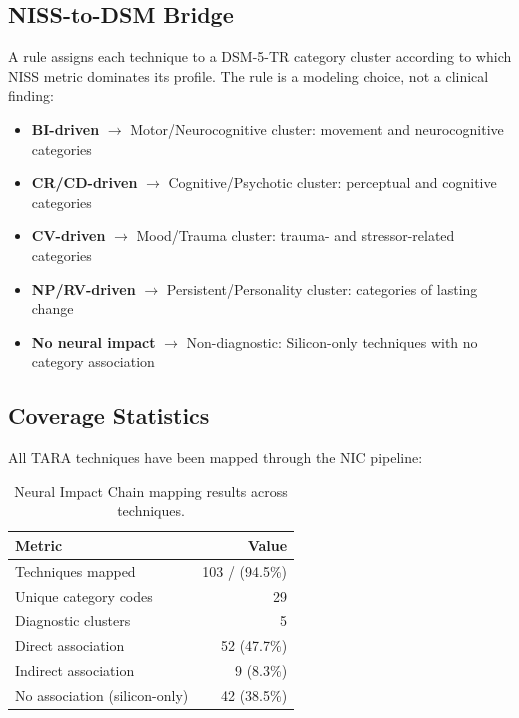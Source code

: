 \subsection{NISS-to-DSM Bridge}

A rule assigns each technique to a DSM-5-TR category cluster according to which NISS
metric dominates its profile. The rule is a modeling choice, not a clinical finding:

\begin{itemize}
  \item \textbf{BI-driven} $\to$ Motor/Neurocognitive cluster: movement and
        neurocognitive categories
  \item \textbf{CR/CD-driven} $\to$ Cognitive/Psychotic cluster: perceptual and
        cognitive categories
  \item \textbf{CV-driven} $\to$ Mood/Trauma cluster: trauma- and stressor-related
        categories
  \item \textbf{NP/RV-driven} $\to$ Persistent/Personality cluster: categories of
        lasting change
  \item \textbf{No neural impact} $\to$ Non-diagnostic: Silicon-only
        techniques with no category association
\end{itemize}

\subsection{Coverage Statistics}

All \SnapshotTechniques{} TARA techniques have been mapped through the NIC pipeline:

\begin{table}[H]
\centering
\caption{Neural Impact Chain mapping results across \SnapshotTechniques{} techniques.}
\label{tab:nic-stats}
\small
\begin{tabular}{@{}l r@{}}
\toprule
\textbf{Metric} & \textbf{Value} \\
\midrule
Techniques mapped                 & 103 / \SnapshotTechniques{} (94.5\%) \\
Unique category codes             & 29 \\
Diagnostic clusters               & 5 \\
Direct association                 & 52 (47.7\%) \\
Indirect association               & 9 (8.3\%) \\
No association (silicon-only)      & 42 (38.5\%) \\
\bottomrule
\end{tabular}
\end{table}

